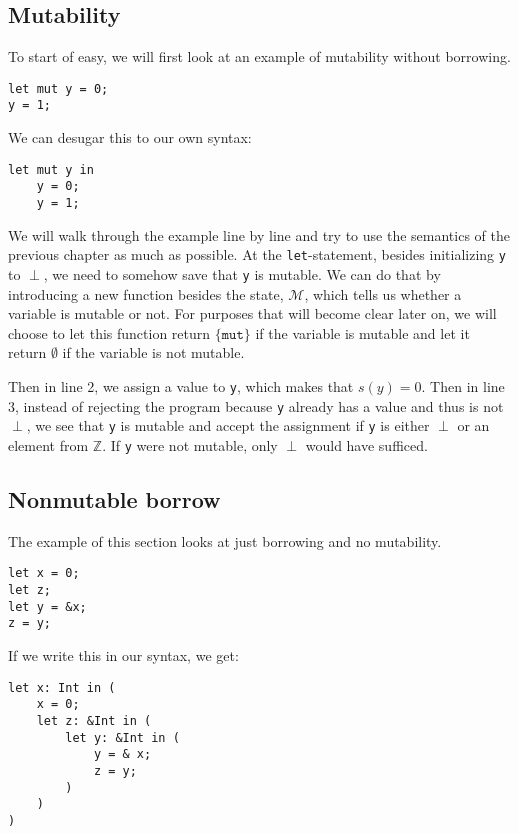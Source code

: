 \subsection{Mutability}
To start of easy, we will first look at an example of mutability without borrowing. 

\begin{verbatim}
let mut y = 0;
y = 1;
\end{verbatim}

We can desugar this to our own syntax:

\begin{verbatim}
let mut y in 
    y = 0;
    y = 1;
\end{verbatim}

We will walk through the example line by line and try to use the semantics of the previous chapter as much as possible. At the \texttt{let}-statement, besides initializing \texttt{y} to $\perp$, we need to somehow save that \texttt{y} is mutable. We can do that by introducing a new function besides the state, $\mathcal{M}$, which tells us whether a variable is mutable or not. For purposes that will become clear later on, we will choose to let this function return $\{\texttt{mut}\}$ if the variable is mutable and let it return $\emptyset$ if the variable is not mutable. 

Then in line 2, we assign a value to \texttt{y}, which makes that $s(y) = 0$. Then in line 3, instead of rejecting the program because \texttt{y} already has a value and thus is not $\perp$, we see that \texttt{y} is mutable and accept the assignment if \texttt{y} is either $\perp$ or an element from $\mathbb{Z}$. If \texttt{y} were not mutable, only $\perp$ would have sufficed. 

\subsection{Nonmutable borrow}
The example of this section looks at just borrowing and no mutability. 
\begin{verbatim}
let x = 0;
let z;
let y = &x;
z = y;
\end{verbatim}

If we write this in our syntax, we get: 

\begin{verbatim}
let x: Int in (
    x = 0;
    let z: &Int in (
        let y: &Int in (
            y = & x;
            z = y;
        )
    ) 
)
\end{verbatim} 

